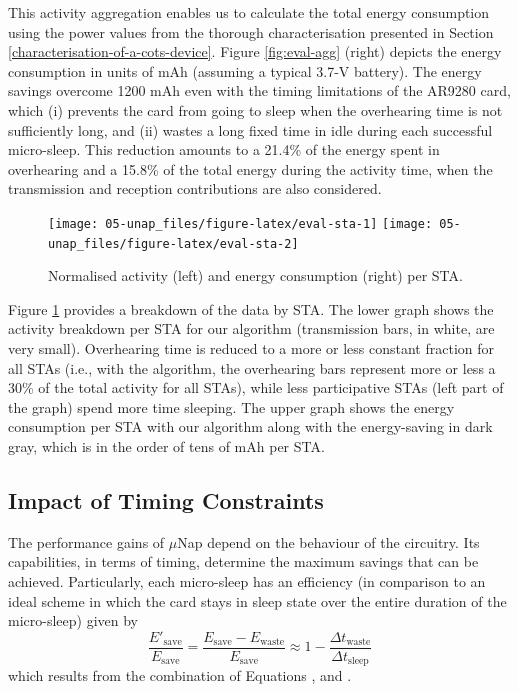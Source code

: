 \documentclass[twoside,nohyper]{tufte-book}
\makeatletter
\let\orig@maketag@@@\maketag@@@
\renewcommand{\eqref}[1]{\textup{\let\maketag@@@\orig@maketag@@@\tagform@{\ref{#1}}}}
\def\maketag@@@#1{\hbox{\rlap{\kern\marginparsep\m@th\normalfont#1}\kern1sp}}
\theoremstyle{definition}
\theoremstyle{definition}
\theoremstyle{definition}
\theoremstyle{remark}
\makeatother
\begin{document}
This activity aggregation enables us to calculate the total energy
consumption using the power values from the thorough characterisation
presented in Section \ref{characterisation-of-a-cots-device}. Figure
\ref{fig:eval-agg} (right) depicts the energy consumption in units of
mAh (assuming a typical 3.7-V battery). The energy savings overcome 1200
mAh even with the timing limitations of the AR9280 card, which (i)
prevents the card from going to sleep when the overhearing time is not
sufficiently long, and (ii) wastes a long fixed time in idle during each
successful micro-sleep. This reduction amounts to a 21.4\% of the energy
spent in overhearing and a 15.8\% of the total energy during the
activity time, when the transmission and reception contributions are
also considered.




\begin{figure}

{\centering \texttt{[image: 05-unap\_files/figure-latex/eval-sta-1]} \texttt{[image: 05-unap\_files/figure-latex/eval-sta-2]} 

}

\caption[Normalised activity (left) and energy consumption (right)
per STA.]{Normalised activity (left) and energy consumption (right)
per STA.}\label{fig:eval-sta}
\end{figure}

Figure \ref{fig:eval-sta} provides a breakdown of the data by STA. The
lower graph shows the activity breakdown per STA for our algorithm
(transmission bars, in white, are very small). Overhearing time is
reduced to a more or less constant fraction for all STAs (i.e., with the
algorithm, the overhearing bars represent more or less a 30\% of the
total activity for all STAs), while less participative STAs (left part
of the graph) spend more time sleeping. The upper graph shows the energy
consumption per STA with our algorithm along with the energy-saving in
dark gray, which is in the order of tens of mAh per STA.

\subsection{Impact of Timing
Constraints}\label{impact-of-timing-constraints}

The performance gains of \(\mu\)Nap depend on the behaviour of the
circuitry. Its capabilities, in terms of timing, determine the maximum
savings that can be achieved. Particularly, each micro-sleep has an
efficiency (in comparison to an ideal scheme in which the card stays in
sleep state over the entire duration of the micro-sleep) given by
%
\begin{equation}
 \frac{E'_\mathrm{save}}{E_\mathrm{save}} = \frac{E_\mathrm{save} - E_\mathrm{waste}}{E_\mathrm{save}} \approx 1 - \frac{\Delta t_\mathrm{waste}}{\Delta t_\mathrm{sleep}}
 \label{eq:fracsave}
\end{equation}
%
which results from the combination of Equations \eqref{eq:idealsleep},
\eqref{eq:realsleep} and \eqref{eq:Ewaste}.
\end{document}
